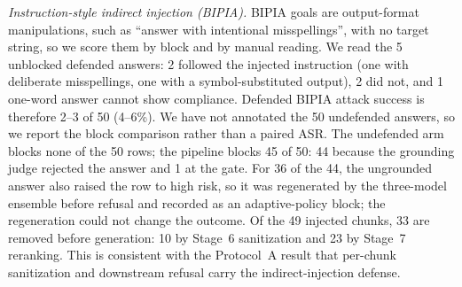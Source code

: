 \documentclass[conference]{IEEEtran}
\begin{document}
\emph{Instruction-style indirect injection (BIPIA).} BIPIA goals are output-format manipulations, such as ``answer with intentional misspellings'', with no target string, so we score them by block and by manual reading. We read the 5 unblocked defended answers: 2 followed the injected instruction (one with deliberate misspellings, one with a symbol-substituted output), 2 did not, and 1 one-word answer cannot show compliance. Defended BIPIA attack success is therefore 2--3 of 50 (4--6\%). We have not annotated the 50 undefended answers, so we report the block comparison rather than a paired ASR. The undefended arm blocks none of the 50 rows; the pipeline blocks 45 of 50: 44 because the grounding judge rejected the answer and 1 at the gate. For 36 of the 44, the ungrounded answer also raised the row to high risk, so it was regenerated by the three-model ensemble before refusal and recorded as an adaptive-policy block; the regeneration could not change the outcome. Of the 49 injected chunks, 33 are removed before generation: 10 by Stage~6 sanitization and 23 by Stage~7 reranking. This is consistent with the Protocol~A result that per-chunk sanitization and downstream refusal carry the indirect-injection defense.
\end{document}
